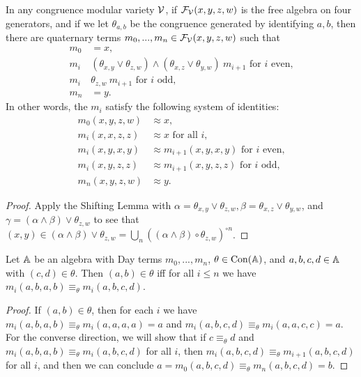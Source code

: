 \begin{appendices}
\begin{cor}\label{day-terms} In any congruence modular variety $\mathcal{V}$, if $\mathcal{F}_{\mathcal{V}}(x,y,z,w)$ is the free algebra on four generators, and if we let $\theta_{a,b}$ be the congruence generated by identifying $a,b$, then there are quaternary terms $m_0, ..., m_n \in \mathcal{F}_{\mathcal{V}}(x,y,z,w)$ such that
\begin{align*}
m_0 &= x,\\
m_i\ &(\theta_{x,y}\vee \theta_{z,w})\wedge (\theta_{x,z}\vee \theta_{y,w})\ m_{i+1}\text{ for $i$ even,}\\
m_i\ &\theta_{z,w}\ m_{i+1}\text{ for $i$ odd,}\\
m_n &= y.
\end{align*}
In other words, the $m_i$ satisfy the following system of identities:
\begin{align*}
m_0(x,y,z,w) &\approx x,\\
m_i(x,x,z,z) &\approx x\text{ for all $i$,}\\
m_i(x,y,x,y) &\approx m_{i+1}(x,y,x,y)\text{ for $i$ even,}\\
m_i(x,y,z,z) &\approx m_{i+1}(x,y,z,z)\text{ for $i$ odd,}\\
m_n(x,y,z,w) &\approx y.
\end{align*}
\end{cor}
\begin{proof} Apply the Shifting Lemma with $\alpha = \theta_{x,y}\vee \theta_{z,w}, \beta = \theta_{x,z}\vee \theta_{y,w}$, and $\gamma = (\alpha \wedge \beta)\vee \theta_{z,w}$ to see that $(x,y) \in (\alpha \wedge \beta)\vee \theta_{z,w} = \bigcup_n ((\alpha \wedge \beta)\circ \theta_{z,w})^{\circ n}$.
\end{proof}

\begin{lem}\label{day-congruence} Let $\mathbb{A}$ be an algebra with Day terms $m_0, ..., m_n$, $\theta \in \operatorname{Con}(\mathbb{A})$, and $a,b,c,d \in \mathbb{A}$ with $(c,d) \in \theta$. Then $(a,b) \in \theta$ iff for all $i \le n$ we have $m_i(a,b,a,b) \equiv_\theta m_i(a,b,c,d)$.
\end{lem}
\begin{proof} If $(a,b) \in \theta$, then for each $i$ we have $m_i(a,b,a,b) \equiv_\theta m_i(a,a,a,a) = a$ and $m_i(a,b,c,d) \equiv_\theta m_i(a,a,c,c) = a$. For the converse direction, we will show that if $c \equiv_\theta d$ and $m_i(a,b,a,b) \equiv_\theta m_i(a,b,c,d)$ for all $i$, then $m_i(a,b,c,d) \equiv_\theta m_{i+1}(a,b,c,d)$ for all $i$, and then we can conclude $a = m_0(a,b,c,d) \equiv_\theta m_n(a,b,c,d) = b$.


\end{proof}
\end{appendices}
